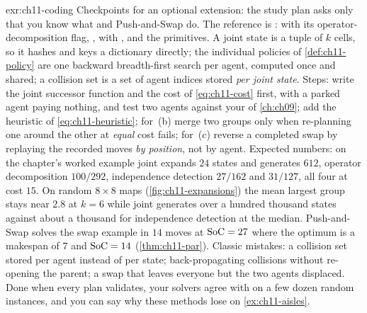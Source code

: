 
\begin{solution}{exr:ch11-coding}
Checkpoints for an optional extension: the study plan asks only that you know what \mstar
and Push-and-Swap do. The reference is :  with its
operator-decomposition flag, ,  with
, and the  primitives. A joint state is a
tuple of $k$ cells, so it hashes and keys a dictionary directly; the individual policies
of \cref{def:ch11-policy} are one backward breadth-first search per agent, computed once
and shared; a collision set is a set of agent indices stored \emph{per joint state}.
Steps: write the joint successor function and the cost of \cref{eq:ch11-cost} first, with
a parked agent paying nothing, and test two agents against your \cbs of \cref{ch:ch09};
add the heuristic of \cref{eq:ch11-heuristic}; for~(b) merge two groups only when
re-planning one around the other at \emph{equal} cost fails; for~(c) reverse a completed
swap by replaying the recorded moves \emph{by position}, not by agent. Expected numbers:
on the chapter's worked example joint \astar expands $24$ states and generates $612$,
operator decomposition $100/292$, independence detection $27/162$ and \mstar $31/127$, all
four at cost $15$. On random $8\times8$ maps (\cref{fig:ch11-expansions}) the mean largest
group stays near $2.8$ at $k=6$ while joint \astar generates over a hundred thousand
states against about a thousand for independence detection at the median. Push-and-Swap
solves the swap example in $14$ moves at $\mathrm{SoC}=27$ where the optimum is a makespan of
$7$ and $\mathrm{SoC}=14$ (\cref{thm:ch11-par}). Classic mistakes: a collision set stored per
agent instead of per state; back-propagating collisions without re-opening the parent; a
swap that leaves everyone but the two agents displaced. Done when every plan validates,
your solvers agree with  on a few dozen random instances, and you can
say why these methods lose on \cref{ex:ch11-aisles}.
\end{solution}
